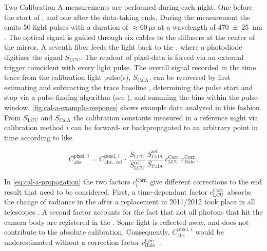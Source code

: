 Two Calibration A measurements are performed during each night. One before the 
start of \DAQ, and one after the data-taking ends. During the measurement the 
\LED emits 50 light pulses with a duration of $\approx\SI{60}{\micro\second}$ at
a wavelength of \SI{470\pm25}{\nano\meter} \cite{menshikovLEDCalibrationUnit}. 
The optical signal is guided through six cables to the diffusers at the center 
of the mirror. A seventh fiber feeds the light back to the \LCU, where a
photodiode digitizes the signal $S_\mathrm{LCU}$. The readout of pixel-data is 
forced via an external trigger coincident with every light pulse. The overall
signal recorded in the \FD time trace from the calibration light pulse(s),
$S_\mathrm{CalA}$, can be recovered by first estimating and subtracting the 
trace baseline \cite{schaferReconstructionBaselineUndershoot2022}, determining 
the pulse start and stop via a pulse-finding algorithm (see ), and summing the \ADC bins within the pulse-window. 
\cref{fig:cal-a-example-response} shows example data analyzed in this fashion. 
From $S_\mathrm{LCU}$ and $S_\mathrm{CalA}$ the calibration constants measured 
in a reference night via calibration method $i$ can be forward- or 
backpropagated to an arbitrary point in time according to 
\cite{salinaNewCalibrationTask2014, salinaAnalisiDatiXY2025} like

\begin{equation}
\label{eq:cal-a-propagation}
C^{\mathrm{pixel},\,i}_{\mathrm{abs.}} = C^{\mathrm{pixel},\,i}_{\mathrm{abs.},\,\mathrm{ref}}\,\cdot\,\frac{S_\mathrm{LCU}}{S_\mathrm{LCU}^\mathrm{ref.}}\,\frac{S_\mathrm{CalA}^\mathrm{ref.}}{S_\mathrm{CalA}}\,c_\mathrm{LCU}^\mathrm{Corr.}\,c^\mathrm{Corr.}_\mathrm{Halo}.
\end{equation}

In \cref{eq:cal-a-propagation} the two factors $c^\mathrm{Corr.}_i$ give 
different corrections to the end result that need to be considered. First, a 
time-dependant factor $c^\mathrm{Corr.}_\mathrm{LCU}$ absorbs the change of 
radiance in the \LCU \LED after a replacement in 2011/2012 took place in all 
telescopes \cite{menshikovLEDCalibrationUnit}. A second factor accounts for the 
fact that not all photons that hit the camera body are registered in the \PMTs. 
Some light is reflected away, and does not contribute to the absolute 
calibration. Consequently, $C^{\mathrm{pixel},\,i}_\mathrm{abs.}$ would be 
underestimated without a correction factor $c^\mathrm{Corr.}_\mathrm{Halo}$ 
\cite{brackFluorescenceDetectorAbsolute13}.

